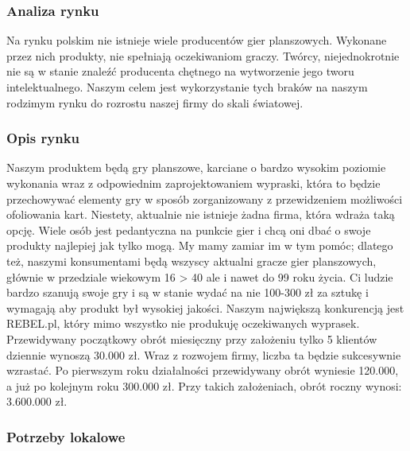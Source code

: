 \documentclass[a4paper, 11pt]{article}
\begin{document}
	\subsubsection{Analiza rynku}
	\indent
	
	Na rynku polskim nie istnieje wiele producentów gier planszowych. Wykonane przez nich produkty, nie spełniają oczekiwaniom graczy. Twórcy, niejednokrotnie nie są w stanie znaleźć producenta chętnego na wytworzenie jego tworu intelektualnego. Naszym celem jest wykorzystanie tych braków na naszym rodzimym rynku do rozrostu naszej firmy do skali światowej.

	
	
	\subsubsection{Opis rynku}
	\indent

	Naszym produktem będą gry planszowe, karciane o bardzo wysokim poziomie wykonania
wraz z odpowiednim zaprojektowaniem wypraski, która to będzie przechowywać elementy gry w sposób zorganizowany z przewidzeniem możliwości ofoliowania kart. Niestety, aktualnie nie istnieje żadna firma, która wdraża taką opcję. Wiele osób jest pedantyczna na punkcie gier i chcą oni dbać o swoje produkty najlepiej jak tylko mogą. My mamy zamiar im w tym pomóc; dlatego też, naszymi konsumentami będą wszyscy aktualni gracze gier planszowych, głównie w przedziale wiekowym 16 > 40 ale i nawet do 99 roku życia. Ci ludzie bardzo szanują swoje gry i są w stanie wydać na nie 100-300 zł za sztukę i wymagają aby produkt był wysokiej jakości. Naszym największą konkurencją jest REBEL.pl, który mimo wszystko nie produkuję oczekiwanych wyprasek. Przewidywany początkowy obrót miesięczny przy założeniu tylko 5 klientów dziennie wynoszą 30.000 zł. Wraz z rozwojem firmy, liczba ta będzie sukcesywnie wzrastać. Po pierwszym roku działalności przewidywany obrót wyniesie 120.000, a już po kolejnym roku 300.000 zł. Przy takich założeniach, obrót roczny wynosi: 3.600.000 zł.

 \subsubsection{Potrzeby lokalowe}
\end{document}
